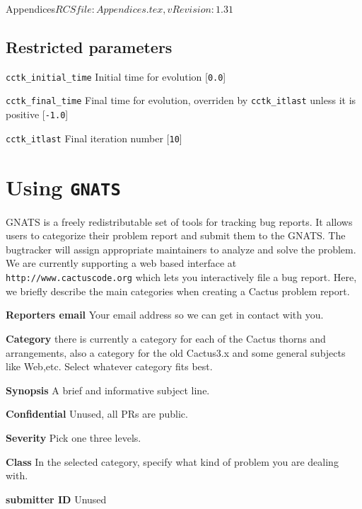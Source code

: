 \begin{cactuspart}{6}{Appendices}{$RCSfile: Appendices.tex,v $}{$Revision: 1.31 $}
\section{Restricted parameters}

\begin{Lentry}

\item[{\tt cctk\_initial\_time}]
Initial time for evolution [{\tt 0.0}]

\item [{\tt cctk\_final\_time}] Final time for evolution, overriden by
{\tt cctk\_itlast} unless it is positive [{\tt -1.0}]

\item [{\tt cctk\_itlast}]
Final iteration number [{\tt 10}]

\end{Lentry}

\chapter{Using {\tt GNATS}}
GNATS is a freely redistributable set of tools for tracking bug
reports. It allows users to categorize their problem report and submit
them to the GNATS. The bugtracker will assign appropriate maintainers
to analyze and solve the problem.
We are currently supporting a web based interface at {\tt
http://www.cactuscode.org} which lets you
interactively file a bug report. Here, we briefly
describe the main categories when creating a Cactus
problem report.
\begin{Lentry}
\item[{\bf Reporters email}] Your email address so we can get in
contact with you.
\item[{\bf Category}] there is currently a category for each of the
Cactus thorns and arrangements, also a category for the old Cactus3.x and
some general subjects like Web,etc. Select whatever category fits
best.
\item[{\bf Synopsis}] A brief and informative subject line.

\item[{\bf Confidential}] Unused, all PRs are public.

\item[{\bf Severity}] Pick one three levels.

\item[{\bf Class}] In the selected category, specify what kind of
problem you are dealing with.

\item[{\bf submitter ID}] Unused


\end{Lentry}
\end{cactuspart}
